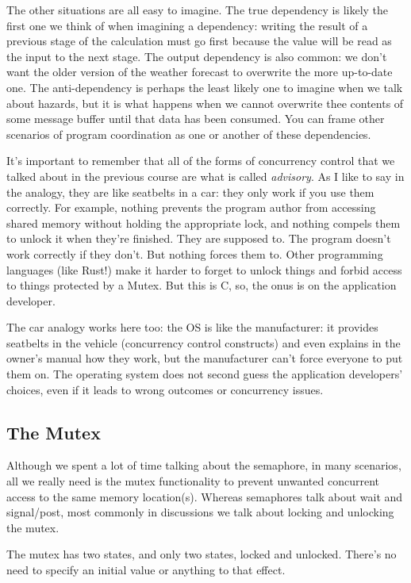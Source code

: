 The other situations are all easy to imagine. The true dependency is likely the first one we think of when imagining a dependency: writing the result of a previous stage of the calculation must go first because the value will be read as the input to the next stage. The output dependency is also common: we don't want the older version of the weather forecast to overwrite the more up-to-date one. The anti-dependency is perhaps the least likely one to imagine when we talk about hazards, but it is what happens when we cannot overwrite thee contents of some message buffer until that data has been consumed. You can frame other scenarios of program coordination as one or another of these dependencies.

It's important to remember that all of the forms of concurrency control that we talked about in the previous course are what is called \textit{advisory}. As I like to say in the analogy, they are like seatbelts in a car: they only work if you use them correctly. For example, nothing prevents the program author from accessing shared memory without holding the appropriate lock, and nothing compels them to unlock it when they're finished. They are supposed to. The program doesn't work correctly if they don't. But nothing forces them to. Other programming languages (like Rust!) make it harder to forget to unlock things and forbid access to things protected by a Mutex. But this is C, so, the onus is on the application developer. 

The car analogy works here too: the OS is like the manufacturer: it provides seatbelts in the vehicle (concurrency control constructs) and even explains in the owner's manual how they work, but the manufacturer can't force everyone to put them on. The operating system does not second guess the application developers' choices, even if it leads to wrong outcomes or concurrency issues. 

\subsection*{The Mutex}

Although we spent a lot of time talking about the semaphore, in many scenarios, all we really need is the mutex functionality to prevent unwanted concurrent access to the same memory location(s). Whereas semaphores talk about wait and signal/post, most commonly in discussions we talk about locking and unlocking the mutex. 

The mutex has two states, and only two states, locked and unlocked. There's no need to specify an initial value or anything to that effect.

